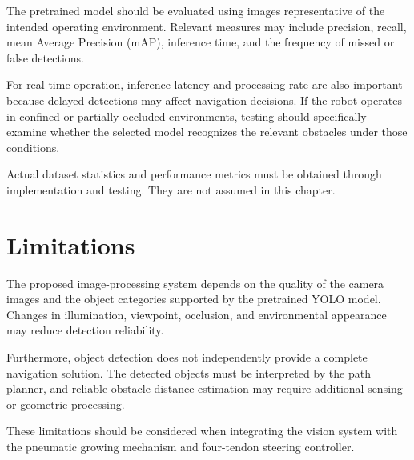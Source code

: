 The pretrained model should be evaluated using images representative of the intended operating environment. Relevant measures may include precision, recall, mean Average Precision (mAP), inference time, and the frequency of missed or false detections.

For real-time operation, inference latency and processing rate are also important because delayed detections may affect navigation decisions. If the robot operates in confined or partially occluded environments, testing should specifically examine whether the selected model recognizes the relevant obstacles under those conditions.

Actual dataset statistics and performance metrics must be obtained through implementation and testing. They are not assumed in this chapter.

\section{Limitations}

The proposed image-processing system depends on the quality of the camera images and the object categories supported by the pretrained YOLO model. Changes in illumination, viewpoint, occlusion, and environmental appearance may reduce detection reliability.

Furthermore, object detection does not independently provide a complete navigation solution. The detected objects must be interpreted by the path planner, and reliable obstacle-distance estimation may require additional sensing or geometric processing.

These limitations should be considered when integrating the vision system with the pneumatic growing mechanism and four-tendon steering controller.